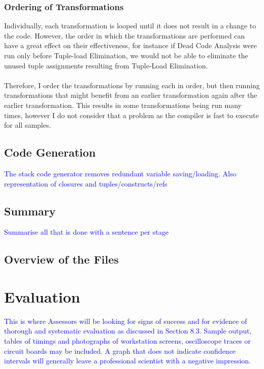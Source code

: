 \documentclass[12pt,twoside,notitlepage]{report}
\newcommand\note[1]{\textcolor{blue}{#1}}
\begin{document}
\subsection{Ordering of Transformations}
Individually, each transformation is looped until it does not result in a change to the code. However, the order in which the transformations are performed can have a great effect on their effectiveness, for instance if Dead Code Analysis were run only before Tuple-load Elimination, we would not be able to eliminate the unused tuple assignments resulting from Tuple-Load Elimination.
\\\\
Therefore, I order the transformations by running each in order, but then running transformations that might benefit from an earlier transformation again after the earlier transformation. This results in some transformations being run many times, however I do not consider that a problem as the compiler is fast to execute for all samples.

\section{Code Generation}
\note{The stack code generator removes redundant variable saving/loading. Also representation of closures and tuples/constructs/refs}





\section{Summary}
\note{Summarise all that is done with a sentence per stage}





\section{Overview of the Files}







\clearpage
\chapter{Evaluation}
\note{This is where Assessors will be looking for signs of success and for evidence of thorough and systematic evaluation as discussed in Section 8.3. Sample output, tables of timings and photographs of workstation screens, oscilloscope traces or circuit boards may be included. A graph that does not indicate confidence intervals will generally leave a professional scientist with a negative impression.}
\end{document}
